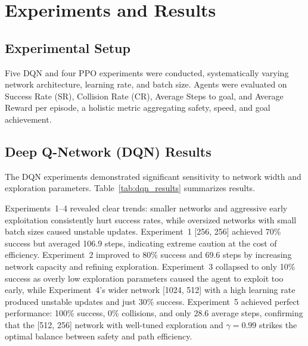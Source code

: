 \documentclass{article}
\begin{document}
\section{Experiments and Results}

\subsection{Experimental Setup}

Five DQN and four PPO experiments were conducted, systematically varying network
architecture, learning rate, and batch size. Agents were evaluated on Success
Rate (SR), Collision Rate (CR), Average Steps to goal, and Average Reward per
episode, a holistic metric aggregating safety, speed, and goal achievement.

\subsection{Deep Q-Network (DQN) Results}

The DQN experiments demonstrated significant sensitivity to network width and
exploration parameters. Table~\ref{tab:dqn_results} summarizes results.

\begin{table}[t]
\centering
{}
\caption{DQN Experimental Results}
\label{tab:dqn_results}
\end{table}

Experiments~1--4 revealed clear trends: smaller networks and aggressive early exploitation consistently hurt success rates, while oversized networks with small batch sizes caused unstable updates. Experiment~1 [256, 256] achieved 70\% success but averaged 106.9 steps, indicating extreme caution at the cost of efficiency. Experiment~2 improved to 80\% success and 69.6 steps by increasing network capacity and refining exploration. Experiment~3 collapsed to only 10\% success as overly low exploration parameters caused the agent to exploit too early, while Experiment~4's wider network [1024, 512] with a high learning rate produced unstable updates and just 30\% success. Experiment~5 achieved perfect performance: 100\% success, 0\% collisions, and only 28.6
average steps, confirming that the [512, 256] network with well-tuned exploration
and $\gamma{=}0.99$ strikes the optimal balance between safety and path
efficiency.
\end{document}
